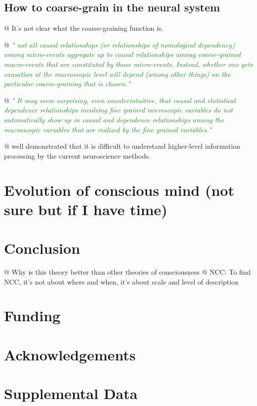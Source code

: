 \documentclass[utf8]{article}
\newenvironment{ants}
			{
			 \begin{easylist}[itemize]
			}
			{
			\end{easylist}
			}
\newcommand{\rewrite}[1]{\textcolor{ForestGreen}{\textit{"#1"}}\newline}
\begin{document}
		\subsection{How to coarse-grain in the neural system}
			\begin{ants}
				@ It's not clear what the coarse-graining function is.
				
				@ \rewrite{
					not all causal relationships (or relationships of nomological dependency) among micro-events aggregate up to causal relationships among coarse-grained macro-events that are constituted by those micro-events. Instead, whether one gets causation at the macroscopic level will depend (among other things) on the particular coarse-graining that is chosen.} \cite{price2007causation}
				
				@ \rewrite{
					It may seem surprising, even counterintuitive, that causal and statistical dependence relationships involving fine grained microscopic variables do not automatically show up in causal and dependence relationships among the macroscopic variables that are realized by the fine grained variables.} \cite{price2007causation}
				
				@ \cite{jonas2017could} well demonstrated that it is difficult to understand higher-level information processing by the current neuroscience methods. 
				
			\end{ants}
	
	\section{Evolution of conscious mind (not sure but if I have time)}
		\cite{dennett2008kinds}
		

	\section{Conclusion}
		\begin{ants}
			@ Why is this theory better than other theories of consciousness
			@ NCC: To find NCC, it's not about where and when, it's about scale and level of description			 
		\end{ants}

	
	
	
	\section*{Funding}
	
	\section*{Acknowledgements}
	
	\section*{Supplemental Data}
	
	
	
	
	
	
\end{document}
